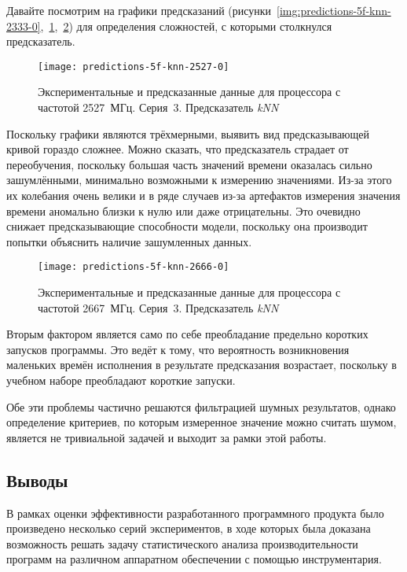 Давайте посмотрим на графики предсказаний (рисунки~\ref{img:predictions-5f-knn-2333-0},~\ref{img:predictions-5f-knn-2527-0},~\ref{img:predictions-5f-knn-2666-0}) для определения сложностей, с которыми столкнулся предсказатель.

\begin{figure}[tbp]
    \begin{center}
        \texttt{[image: predictions-5f-knn-2527-0]}
        \caption{Экспериментальные и предсказанные данные для процессора с частотой 2527~МГц. Серия~3. Предсказатель \textit{kNN}}
        \label{img:predictions-5f-knn-2527-0}
    \end{center}
\end{figure}

Поскольку графики являются трёхмерными, выявить вид предсказывающей кривой гораздо сложнее. Можно сказать, что предсказатель страдает от переобучения, поскольку большая часть значений времени оказалась сильно зашумлёнными, минимально возможными к измерению значениями. Из-за этого их колебания очень велики и в ряде случаев из-за артефактов измерения значения времени аномально близки к нулю или даже отрицательны. Это очевидно снижает предсказывающие способности модели, поскольку она производит попытки объяснить наличие зашумленных данных.

\begin{figure}[tbp]
    \begin{center}
        \texttt{[image: predictions-5f-knn-2666-0]}
        \caption{Экспериментальные и предсказанные данные для процессора с частотой 2667~МГц. Серия~3. Предсказатель \textit{kNN}}
        \label{img:predictions-5f-knn-2666-0}
    \end{center}
\end{figure}

Вторым фактором является само по себе преобладание предельно коротких запусков программы. Это ведёт к тому, что вероятность возникновения маленьких времён исполнения в результате предсказания возрастает, поскольку в учебном наборе преобладают короткие запуски.

Обе эти проблемы частично решаются фильтрацией шумных результатов, однако определение критериев, по которым измеренное значение можно считать шумом, является не тривиальной задачей и выходит за рамки этой работы.


\subsection{Выводы}
В рамках оценки эффективности разработанного программного продукта было произведено несколько серий экспериментов, в ходе которых была доказана возможность решать задачу статистического анализа производительности программ на различном аппаратном обеспечении с помощью инструментария.
